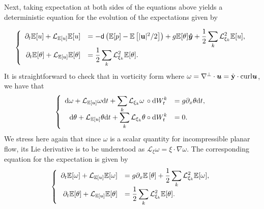 \documentclass[11pt, oneside]{article}   	%
\numberwithin{equation}{section}
\theoremstyle{plain}
\theoremstyle{definition}
\theoremstyle{remark}
\newcommand{\<}{\langle}
\renewcommand{\>}{\rangle}
\def\diff{\textnormal{d}}
\def\p{{\partial}}
\def\u{{\bf{u}}}
\def\y{{\bf{y}}}
\newcommand{\mb}[1]{\mbox{\boldmath{$#1$}}}
\newcommand{\E}[1]{\mathbb{E}\left[{#1}\right]}
\begin{document}
Next, taking expectation at both sides of the equations above yields a deterministic equation for the evolution of the expectations given by

\begin{equation}\label{LA:SALT:Exp:Bou}
\left\{
\begin{array}{rl}
\partial_t \mathbb E[u] + \mathcal L_{\mathbb E[u]} \mathbb E[u] &= -{\sf{d}} \left(\mathbb E[p] - \mathbb E \left[|\u|^2/2\right]\right) + g \mathbb E[\theta] \mb{\hat{y}} +  \displaystyle \displaystyle \frac12 \sum_k \mathcal L_{\xi_k}^2 \mathbb E[u], \\
\partial_t \mathbb E[\theta] + \mathcal L_{\mathbb E[u]} \mathbb E[\theta] &= \displaystyle \displaystyle \frac12 \sum_k \mathcal L_{\xi_k}^2 \mathbb E[\theta].
\end{array}
\right.
\end{equation} 
It is straightforward to check that in vorticity form where $\omega=\nabla^{\perp}\cdot \mb u = \hat{\y}\cdot{\rm curl} \mb u$, we have that 
\begin{equation}\label{LA:SALT:Stra:Bou}
\left\{
\begin{array}{rl}
\diff \omega + \mathcal L_{\mathbb E[u]} \omega \diff t + \displaystyle \displaystyle\sum_k \mathcal L_{\xi_k} \omega \,\circ \diff W_t^k &= g \p_{x}\theta \diff t, \\
\diff \theta + \mathcal L_{\mathbb E[u]} {\theta} \diff t + \displaystyle \displaystyle\sum_k \mathcal L_{\xi_k} {\theta} \circ \diff W_t^k &=0.
\end{array}
\right.
\end{equation}
We stress here again that since $\omega$ is a scalar quantity for incompressible planar flow, its Lie derivative is to be understood as $\mathcal{L}_{\xi} \omega = \xi \cdot \nabla \omega.$ The corresponding equation for the expectation is given by
\begin{equation}\label{LA:Vor:Exp:Bou}
\left\{
\begin{array}{rl}
\partial_t \mathbb E[\omega] + \mathcal L_{\mathbb E[u]} \mathbb E[\omega] &= g \mathbb \p_{x} \E\theta+  \displaystyle \frac12 \displaystyle\sum_k \mathcal L_{\xi_k}^2 \mathbb E[\omega], \\
\partial_t \mathbb E[\theta] + \mathcal L_{\mathbb E[u]} \mathbb E[\theta] &=  \displaystyle \displaystyle \frac{1}{2} \sum_k \mathcal L_{\xi_k}^2 \mathbb E[\theta].
\end{array}
\right.
\end{equation}
\end{document}
